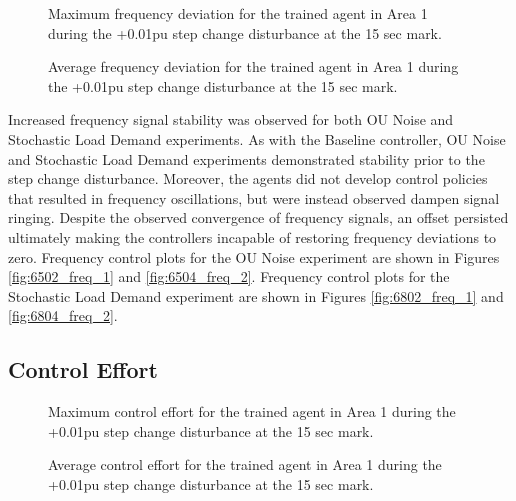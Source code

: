 \begin{figure}[h]
	\begin{minipage}[t]{0.50\textwidth}
		\centering
		\resizebox{7cm}{!}{}
		\caption{Maximum frequency deviation for the trained agent in Area 1 during the +0.01pu step change disturbance at the 15 sec mark.}\label{fig:7203_max_freq}
	\end{minipage}
	\hspace{0.25cm}
	\begin{minipage}[t]{0.50\textwidth}
		\resizebox{7cm}{!}{}
		\caption{Average frequency deviation for the trained agent in Area 1 during the +0.01pu step change disturbance at the 15 sec mark.}\label{fig:7204_avg_freq}
	\end{minipage}
\end{figure}

\newpage

Increased frequency signal stability was observed for both OU Noise and Stochastic Load Demand experiments. As with the Baseline controller, OU Noise and Stochastic Load Demand experiments demonstrated stability prior to the step change disturbance. Moreover, the agents did not develop control policies that resulted in frequency oscillations, but were instead observed dampen signal ringing. Despite the observed convergence of frequency signals, an offset persisted ultimately making the controllers incapable of restoring frequency deviations to zero. Frequency control plots for the OU Noise experiment are shown in Figures \ref{fig:6502_freq_1} and \ref{fig:6504_freq_2}. Frequency control plots for the Stochastic Load Demand experiment are shown in Figures \ref{fig:6802_freq_1} and \ref{fig:6804_freq_2}.

\subsection{Control Effort}

\begin{figure}[h]
	\begin{minipage}[t]{0.50\textwidth}
		\centering
		\resizebox{7cm}{!}{}
		\caption{Maximum control effort for the trained agent in Area 1 during the +0.01pu step change disturbance at the 15 sec mark.}
	\end{minipage}
	\hspace{0.25cm}
	\begin{minipage}[t]{0.50\textwidth}
		\resizebox{7cm}{!}{}
		\caption{Average control effort for the trained agent in Area 1 during the +0.01pu step change disturbance at the 15 sec mark.}
	\end{minipage}
\end{figure}

